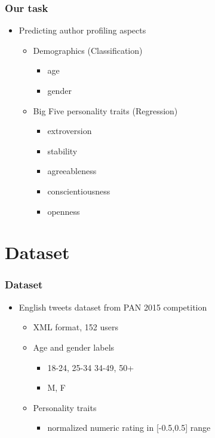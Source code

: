 \documentclass[slidestop,compress,11pt,xcolor=dvipsnames]{beamer}
\begin{document}




\begin{frame}
\frametitle{Our task}
\vspace{-2mm}
\begin{itemize}
	\item Predicting author profiling aspects
	\begin{itemize}
		\item Demographics (Classification)
		\begin{itemize}
			\item age
			\item gender
		\end{itemize}
		\item Big Five personality traits (Regression)
		\begin{itemize}
			\item extroversion
			\item stability
			\item agreeableness
			\item conscientiousness
			\item openness
		\end{itemize}
	\end{itemize}
\end{itemize}
\end{frame}




\section{Dataset}


\begin{frame}
\frametitle{Dataset}
\begin{itemize}
	\item English tweets dataset from PAN 2015 competition
	\begin{itemize}
			\item XML format, 152 users
			\item Age and gender labels
			\begin{itemize}
				\item 18-24, 25-34 34-49, 50+
				\item M, F
			\end{itemize}
			\item Personality traits
			\begin{itemize}
				\item normalized numeric rating in [-0.5,0.5] range
			\end{itemize}
		\end{itemize}
\end{itemize}
\end{frame}
\end{document}
